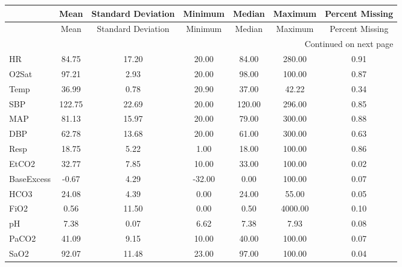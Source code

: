 \begin{longtable}{lcccccc}
\label{tab_describe}\\
\toprule
\hline
{} &   Mean & Standard Deviation &  Minimum & Median & Maximum & Percent Missing \\
\midrule
\hline
\endfirsthead

\toprule
{} &   Mean & Standard Deviation &  Minimum & Median & Maximum & Percent Missing \\
\midrule
\endhead
\midrule
\multicolumn{7}{r}{{Continued on next page}} \\
\midrule
\endfoot

\bottomrule
\hline
\endlastfoot
HR               &  84.75 &              17.20 &    20.00 &  84.00 &  280.00 &            0.91 \\
O2Sat            &  97.21 &               2.93 &    20.00 &  98.00 &  100.00 &            0.87 \\
Temp             &  36.99 &               0.78 &    20.90 &  37.00 &   42.22 &            0.34 \\
SBP              & 122.75 &              22.69 &    20.00 & 120.00 &  296.00 &            0.85 \\
MAP              &  81.13 &              15.97 &    20.00 &  79.00 &  300.00 &            0.88 \\
DBP              &  62.78 &              13.68 &    20.00 &  61.00 &  300.00 &            0.63 \\
Resp             &  18.75 &               5.22 &     1.00 &  18.00 &  100.00 &            0.86 \\
EtCO2            &  32.77 &               7.85 &    10.00 &  33.00 &  100.00 &            0.02 \\
BaseExcess       &  -0.67 &               4.29 &   -32.00 &   0.00 &  100.00 &            0.07 \\
HCO3             &  24.08 &               4.39 &     0.00 &  24.00 &   55.00 &            0.05 \\
FiO2             &   0.56 &              11.50 &     0.00 &   0.50 & 4000.00 &            0.10 \\
pH               &   7.38 &               0.07 &     6.62 &   7.38 &    7.93 &            0.08 \\
PaCO2            &  41.09 &               9.15 &    10.00 &  40.00 &  100.00 &            0.07 \\
SaO2             &  92.07 &              11.48 &    23.00 &  97.00 &  100.00 &            0.04 \\

\end{longtable}
